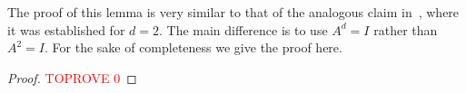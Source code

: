 The proof of this lemma is very similar to that of the analogous claim
in~\cite[Lemma~3]{AKS19:jcss}, where it was established for $d=2$.
The main difference is to 
use $A^d=I$ rather than $A^2=I$. For the sake of completeness we give the proof here.

\noindent\begin{proof}\textcolor{red}{TOPROVE 0}\end{proof}

